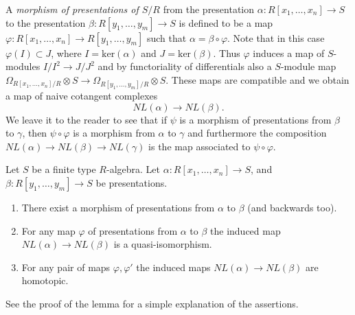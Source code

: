 \medskip\noindent
A {\it morphism of presentations of $S/R$} from the presentation
$\alpha : R[x_1, \ldots, x_n] \to S$ to the presentation
$\beta : R[y_1, \ldots, y_m] \to S$ is defined to be a
map $\varphi : R[x_1, \ldots, x_n] \to R[y_1, \ldots, y_m]$
such that $\alpha = \beta \circ \varphi$. Note that
in this case $\varphi(I) \subset J$, where $I = \text{ker}(\alpha)$
and $J = \text{ker}(\beta)$. Thus $\varphi$ induces a map
of $S$-modules $I/I^2 \to J/J^2$ and by functoriality of
differentials also a $S$-module map
$\Omega_{R[x_1, \ldots, x_n]/R}\otimes S
\to \Omega_{R[y_1, \ldots, y_m]/R}\otimes S$.
These maps are compatible and we obtain a map
of naive cotangent complexes
$$
NL(\alpha) \longrightarrow NL(\beta).
$$
We leave it to the reader to see that if $\psi$ is a morphism
of presentations from $\beta$ to $\gamma$, then $\psi \circ \varphi$
is a morphism from $\alpha$ to $\gamma$ and furthermore
the composition $NL(\alpha) \to NL(\beta) \to NL(\gamma)$
is the map associated to $\psi \circ \varphi$.

\begin{lemma}
\label{lemma-NL-homotopy}
Let $S$ be a finite type $R$-algebra.
Let $\alpha : R[x_1, \ldots, x_n] \to S$, and
$\beta : R[y_1, \ldots, y_m] \to S$ be presentations.
\begin{enumerate}
\item There exist a morphism of presentations from $\alpha$
to $\beta$ (and backwards too).
\item For any map $\varphi$ of presentations from
$\alpha$ to $\beta$ the induced map $NL(\alpha) \to NL(\beta)$
is a quasi-isomorphism.
\item For any pair of maps $\varphi, \varphi'$ the induced maps
$NL(\alpha) \to NL(\beta)$ are homotopic.
\end{enumerate}
See the proof of the lemma for a simple explanation
of the assertions.
\end{lemma}

